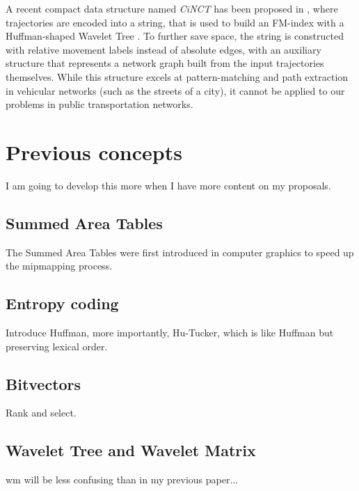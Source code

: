 \documentclass[a4paper,10pt,twoside]{book}
\begin{document}
    
    A recent compact data structure named {\em CiNCT} has been proposed in \cite{koide2018cinct}, where trajectories are encoded into a string, that is used to build an FM-index \cite{DBLP:conf/focs/FerraginaM00} with a Huffman-shaped Wavelet Tree \cite{ferragina2009compressed}. To further save space, the string is constructed with relative movement labels instead of absolute edges, with an auxiliary structure that represents a network graph built from the input trajectories themselves. While this structure excels at pattern-matching and path extraction in vehicular networks (such as the streets of a city), it cannot be applied to our problems in public transportation networks.
	
\chapter{Previous concepts}
	I am going to develop this more when I have more content on my proposals.
	
	\section{Summed Area Tables}
	The Summed Area Tables were first introduced in computer graphics \cite{crow1984summed} to speed up the mipmapping process.
	
	\section{Entropy coding}
	Introduce Huffman, more importantly, Hu-Tucker, which is like Huffman but preserving lexical order.
	
	\section{Bitvectors}
	Rank and select.
	
	\section{Wavelet Tree and Wavelet Matrix}
	\label{sec:wt}
	\gls{wm} will be less confusing than in my previous paper...
	
\end{document}
